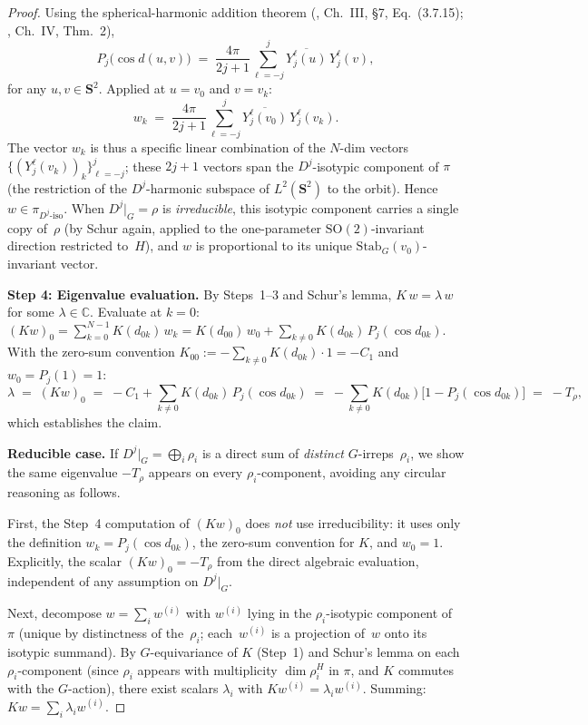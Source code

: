 \begin{proof}
Using the spherical-harmonic addition theorem
(\citealt{Vilenkin1968}, Ch.~III, \S7, Eq.~(3.7.15);
\citealt{Stein1971Principles}, Ch.~IV, Thm.~2),
\begin{equation}\label{eq:addition-thm}
  P_j\bigl(\cos d(u, v)\bigr)
  \;=\; \frac{4\pi}{2j+1} \sum_{\ell = -j}^{j}
    \overline{Y_j^\ell(u)}\, Y_j^\ell(v),
\end{equation}
for any $u, v \in \mathbf{S}^2$.  Applied at $u = v_0$ and
$v = v_k$:
\begin{equation}\label{eq:w-sph-expansion}
  w_k \;=\; \frac{4\pi}{2j+1}
    \sum_{\ell = -j}^{j} \overline{Y_j^\ell(v_0)}\, Y_j^\ell(v_k).
\end{equation}
The vector $w_k$ is thus a specific linear combination of the
$N$-dim vectors $\{(Y_j^\ell(v_k))_k\}_{\ell = -j}^{j}$; these
$2j{+}1$ vectors span the $D^j$-isotypic component of $\pi$
(the restriction of the $D^j$-harmonic subspace of
$L^2(\mathbf{S}^2)$ to the orbit).  Hence
$w \in \pi_{D^j\text{-iso}}$.  When $D^j|_G = \rho$ is
\emph{irreducible}, this isotypic component carries a single
copy of~$\rho$ (by Schur again, applied to the one-parameter
$\mathrm{SO}(2)$-invariant direction restricted to~$H$), and
$w$ is proportional to its unique $\mathrm{Stab}_G(v_0)$-invariant
vector.

\textbf{Step 4: Eigenvalue evaluation.}
By Steps~1–3 and Schur's lemma, $K\,w = \lambda\,w$ for some
$\lambda \in \mathbb{C}$.  Evaluate at $k = 0$:
$(K w)_0 = \sum_{k=0}^{N-1} K(d_{0k})\, w_k
= K(d_{00})\, w_0 + \sum_{k \ne 0} K(d_{0k})\, P_j(\cos d_{0k})$.
With the zero-sum convention
$K_{00} := -\sum_{k \ne 0} K(d_{0k})\cdot 1 = -C_1$ and
$w_0 = P_j(1) = 1$:
\[
  \lambda \;=\; (K w)_0
  \;=\; -C_1 + \sum_{k \ne 0} K(d_{0k})\, P_j(\cos d_{0k})
  \;=\; -\sum_{k \ne 0} K(d_{0k})\bigl[1 - P_j(\cos d_{0k})\bigr]
  \;=\; -T_\rho,
\]
which establishes the claim.

\textbf{Reducible case.}
If $D^j|_G = \bigoplus_i \rho_i$ is a direct sum of
\emph{distinct} $G$-irreps~$\rho_i$, we show the same
eigenvalue $-T_\rho$ appears on every $\rho_i$-component,
avoiding any circular reasoning as follows.

First, the Step~4 computation of $(Kw)_0$ does \emph{not} use
irreducibility: it uses only the definition $w_k = P_j(\cos
d_{0k})$, the zero-sum convention for $K$, and $w_0 = 1$.
Explicitly, the scalar $(Kw)_0 = -T_\rho$ from the direct
algebraic evaluation, independent of any assumption on
$D^j|_G$.

Next, decompose $w = \sum_i w^{(i)}$ with $w^{(i)}$ lying in
the $\rho_i$-isotypic component of~$\pi$
(unique by distinctness of the~$\rho_i$; each~$w^{(i)}$ is a
projection of~$w$ onto its isotypic summand).  By $G$-equivariance
of $K$ (Step~1) and Schur's lemma on each $\rho_i$-component
(since $\rho_i$ appears with multiplicity $\dim \rho_i^H$ in
$\pi$, and $K$ commutes with the $G$-action), there exist
scalars $\lambda_i$ with $K w^{(i)} = \lambda_i w^{(i)}$.
Summing: $K w = \sum_i \lambda_i w^{(i)}$.


\end{proof}

